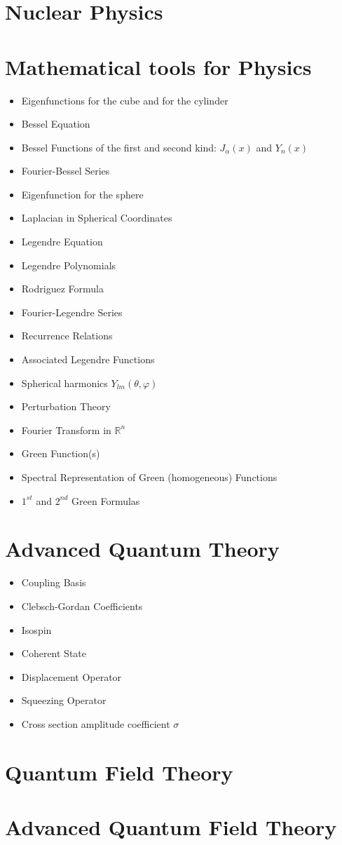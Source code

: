 \documentclass[10pt]{article}
\begin{document}
\section{Nuclear Physics}
\section{Mathematical tools for Physics}
\begin{itemize}
	\item Eigenfunctions for the cube and for the cylinder
	\item Bessel Equation
	\item Bessel Functions of the first and second kind: $ J_{\alpha}(x) $ and $ Y_n(x) $
	\item Fourier-Bessel Series
	\item Eigenfunction for the sphere
	\item Laplacian in Spherical Coordinates
	\item Legendre Equation
	\item Legendre Polynomials
	\item Rodriguez Formula 
	\item Fourier-Legendre Series
	\item Recurrence Relations
	\item Associated Legendre Functions
	\item Spherical harmonics $ Y_{lm}(\theta,\varphi) $
	\item Perturbation Theory
	\item Fourier Transform in $\mathbb{R}^n$
	\item Green Function(s)
	\item Spectral Representation of Green (homogeneous) Functions
	\item $1^{st}$ and $2^{nd}$ Green Formulas
\end{itemize}
\section{Advanced Quantum Theory}
\begin{itemize}
	\item Coupling Basis
	\item Clebsch-Gordan Coefficients
	\item Isospin
	\item Coherent State
	\item Displacement Operator
	\item Squeezing Operator
	\item Cross section amplitude coefficient $\sigma$
\end{itemize}
\section{Quantum Field Theory}
\section{Advanced Quantum Field Theory}
\end{document}
